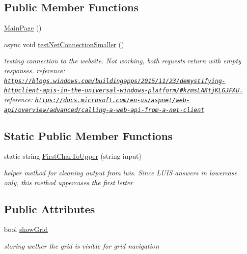 \subsection*{Public Member Functions}
\begin{DoxyCompactItemize}
\item 
\hyperlink{class_listen_to_me_1_1_main_page_afb2ff548c6284f6f179fc9b3dcc89245}{Main\+Page} ()
\item 
async void \hyperlink{class_listen_to_me_1_1_main_page_a4adb881a143354b71604cfa79ea69e25}{test\+Net\+Connection\+Smaller} ()
\begin{DoxyCompactList}\small\item\em testing connection to the website. Not working, both requests return with empty responses. reference\+: \href{https://blogs.windows.com/buildingapps/2015/11/23/demystifying-httpclient-apis-in-the-universal-windows-platform/#kzmsLAKtjKLGJFAU.97}{\tt https\+://blogs.\+windows.\+com/buildingapps/2015/11/23/demystifying-\/httpclient-\/apis-\/in-\/the-\/universal-\/windows-\/platform/\#kzms\+L\+A\+Ktj\+K\+L\+G\+J\+F\+A\+U.} reference\+: \href{https://docs.microsoft.com/en-us/aspnet/web-api/overview/advanced/calling-a-web-api-from-a-net-client}{\tt https\+://docs.\+microsoft.\+com/en-\/us/aspnet/web-\/api/overview/advanced/calling-\/a-\/web-\/api-\/from-\/a-\/net-\/client} \end{DoxyCompactList}\end{DoxyCompactItemize}
\subsection*{Static Public Member Functions}
\begin{DoxyCompactItemize}
\item 
static string \hyperlink{class_listen_to_me_1_1_main_page_af4469348ffee9a5d1a8680d2535a279b}{First\+Char\+To\+Upper} (string input)
\begin{DoxyCompactList}\small\item\em helper method for cleaning output from luis. Since L\+U\+IS answers in lowercase only, this method uppercases the first letter \end{DoxyCompactList}\end{DoxyCompactItemize}
\subsection*{Public Attributes}
\begin{DoxyCompactItemize}
\item 
bool \hyperlink{class_listen_to_me_1_1_main_page_a03679610fded2c61480540ebcc7e4667}{show\+Grid}
\begin{DoxyCompactList}\small\item\em storing wether the grid is visible for grid navigation \end{DoxyCompactList}\end{DoxyCompactItemize}
